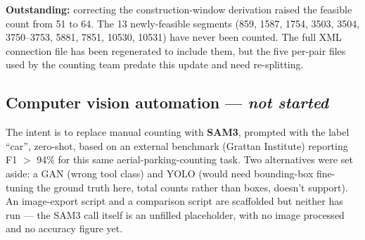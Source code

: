 \documentclass[10pt,conference]{IEEEtran}
\begin{document}
\textbf{Outstanding:} correcting the construction-window derivation raised the feasible count from 51 to 64. The 13 newly-feasible segments (859, 1587, 1754, 3503, 3504, 3750--3753, 5881, 7851, 10530, 10531) have never been counted. The full XML connection file has been regenerated to include them, but the five per-pair files used by the counting team predate this update and need re-splitting.

\subsection{Computer vision automation --- \textit{not started}}
The intent is to replace manual counting with \textbf{SAM3}, prompted with the label ``car'', zero-shot, based on an external benchmark (Grattan Institute) reporting F1 $>$ 94\% for this same aerial-parking-counting task. Two alternatives were set aside: a GAN (wrong tool class) and YOLO (would need bounding-box fine-tuning the ground truth here, total counts rather than boxes, doesn't support). An image-export script and a comparison script are scaffolded but neither has run --- the SAM3 call itself is an unfilled placeholder, with no image processed and no accuracy figure yet.
\end{document}
